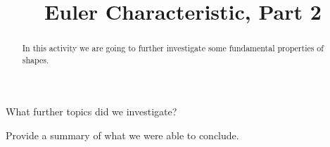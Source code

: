 \documentclass{ximera}
\title{Euler Characteristic, Part 2}
\begin{document}
\begin{abstract}
In this activity we are going to further investigate some fundamental
properties of shapes.
\end{abstract}
\maketitle

\begin{question}
What further topics did we investigate? 
\begin{freeResponse}
\end{freeResponse}
\end{question}


\begin{question}
Provide a summary of what we were able to conclude.
\begin{freeResponse}
\end{freeResponse}
\end{question}
\end{document}
